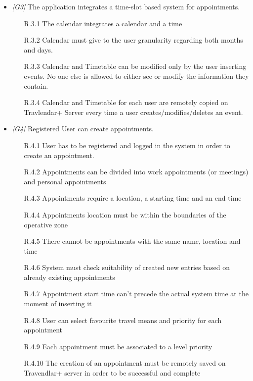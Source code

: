 \begin{itemize}
	\item \textit{[G3]} The application integrates a time-slot based system for appointments.
		\begin{itemize}
			\item [R.3.1] The calendar integrates a calendar and a time
			\item [R.3.2] Calendar must give to the user granularity regarding both months and days.
			\item [R.3.3] Calendar and Timetable can be modified only by the user inserting events. No one else is allowed to either see or modify the information they contain.
			\item [R.3.4] Calendar and Timetable for each user are remotely copied on Travlendar+ Server every time a user creates/modifies/deletes an event.
		\end{itemize}
                  
	
	\item \textit{[G4]} Registered User can create appointments.
		\begin{itemize}
			\item [R.4.1] User has to be registered and logged in the system in order to create an
appointment.
			\item [R.4.2] Appointments can be divided into work appointments (or meetings) and personal appointments
			\item [R.4.3] Appointments require a location, a starting time and an end time
			\item [R.4.4] Appointments location must be within the boundaries of the operative zone
			\item [R.4.5] There cannot be appointments with the same name, location and time
			\item [R.4.6] System must check suitability of created new entries based on already existing appointments
			\item [R.4.7] Appointment start time can't precede the actual system time at the moment of inserting it                                 							
			\item [R.4.8] User can select favourite travel means and priority for each appointment
			\item [R.4.9] Each appointment must be associated to a level priority
			\item [R.4.10] The creation of an appointment must be remotely saved on Travendlar+ server in order to be successful and complete
		\end{itemize}



\end{itemize}
